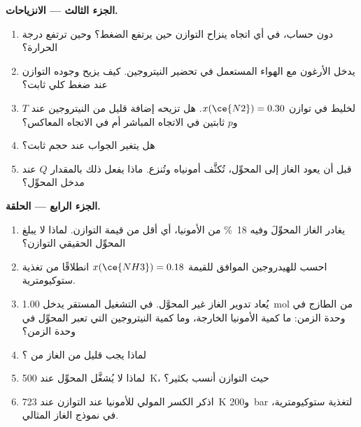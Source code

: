\begin{problem}
\medskip
\noindent\textbf{الجزء الثالث --- الانزياحات.}
\begin{enumerate}[resume]
  \item دون حساب، في أي اتجاه ينزاح التوازن حين يرتفع
        الضغط؟ وحين ترتفع درجة الحرارة؟
  \item يدخل الأرغون مع الهواء المستعمل في تحضير النيتروجين. كيف يزيح وجوده
        التوازن عند ضغط كلي ثابت؟
  \item لخليط في توازن $x(\ce{N2}) = 0.30$. هل تزيحه إضافة قليل من
        النيتروجين عند $T$ و$p$ ثابتين في الاتجاه المباشر أم في الاتجاه المعاكس؟
  \item هل يتغير الجواب عند حجم ثابت؟
  \item قبل أن يعود الغاز إلى المحوِّل، تُكثَّف أمونياه
        وتُنزع. ماذا يفعل ذلك بالمقدار $Q$ عند مدخل المحوِّل؟
\end{enumerate}

\medskip
\noindent\textbf{الجزء الرابع --- الحلقة.}
\begin{enumerate}[resume]
  \item يغادر الغاز المحوِّلَ وفيه \qty{18}{\percent} من الأمونيا، أي أقل من
        قيمة التوازن. لماذا لا يبلغ المحوِّل الحقيقي
        التوازن؟
  \item احسب  للهيدروجين الموافق
        للقيمة $x(\ce{NH3}) = 0.18$ انطلاقًا من تغذية ستوكيومترية.
  \item يُعاد تدوير الغاز غير المحوَّل. في التشغيل المستقر يدخل \qty{1.00}{mol}
        من  الطازج في وحدة الزمن: ما كمية الأمونيا الخارجة، وما
        كمية النيتروجين التي تعبر المحوِّل في وحدة الزمن؟
  \item لماذا يجب  قليل من الغاز من ؟
  \item لماذا لا يُشغَّل المحوِّل عند \qty{500}{K}، حيث التوازن
        أنسب بكثير؟
  \item اذكر الكسر المولي للأمونيا عند التوازن عند \qty{723}{K} 
        و\qty{200}{bar} لتغذية ستوكيومترية، في نموذج الغاز المثالي.
\end{enumerate}
\end{problem}

